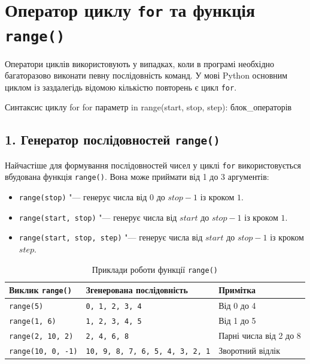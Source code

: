 \documentclass{scrreprt}
\begin{document}
	
	
	\chapter{Оператор циклу \texttt{for} та функція \texttt{range()}}
	
	Оператори циклів використовують у випадках, коли в програмі необхідно багаторазово виконати певну послідовність команд. У мові Python основним циклом із заздалегідь відомою кількістю повторень є цикл \texttt{for}.
	
	\vspace{0.3cm}
	
	\begin{pydef}
Синтаксис циклу for
for параметр in range(start, stop, step):
    блок_операторів
	\end{pydef}
	
	\vspace{0.3cm}
	
	\section*{1. Генератор послідовностей \texttt{range()}}
	
	Найчастіше для формування послідовностей чисел у циклі \texttt{for} використовується вбудована функція \texttt{range()}. Вона може приймати від 1 до 3 аргументів:
	
	\begin{itemize}
		\item \texttt{range(stop)} "--- генерує числа від $0$ до $stop - 1$ із кроком $1$.
		\item \texttt{range(start, stop)} "--- генерує числа від $start$ до $stop - 1$ із кроком $1$.
		\item \texttt{range(start, stop, step)} "--- генерує числа від $start$ до $stop - 1$ із кроком $step$.
	\end{itemize}
	
	\begin{table}[htbp]
		\centering
		\renewcommand{\arraystretch}{1.3}
		\begin{tabular}{|l|l|l|}
			\hline
			\textbf{Виклик \texttt{range()}} & \textbf{Згенерована послідовність} & \textbf{Примітка} \\ \hline
			\texttt{range(5)} & \texttt{0, 1, 2, 3, 4} & Від 0 до 4 \\ \hline
			\texttt{range(1, 6)} & \texttt{1, 2, 3, 4, 5} & Від 1 до 5 \\ \hline
			\texttt{range(2, 10, 2)} & \texttt{2, 4, 6, 8} & Парні числа від 2 до 8 \\ \hline
			\texttt{range(10, 0, -1)} & \texttt{10, 9, 8, 7, 6, 5, 4, 3, 2, 1} & Зворотний відлік \\ \hline
		\end{tabular}
		\caption{Приклади роботи функції \texttt{range()}}
	\end{table}
\end{document}
